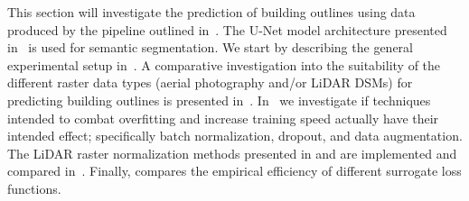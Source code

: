 This section will investigate the prediction of building outlines using data produced by the pipeline outlined in~.
The U-Net model architecture presented in~ is used for semantic segmentation.
We start by describing the general experimental setup in~.
A comparative investigation into the suitability of the different raster data types (aerial photography and/or LiDAR DSMs) for predicting building outlines is presented in~.
In~ we investigate if techniques intended to combat overfitting and increase training speed actually have their intended effect; specifically batch normalization, dropout, and data augmentation.
The LiDAR raster normalization methods presented in  and  are implemented and compared in~.
Finally,  compares the empirical efficiency of different surrogate loss functions.
